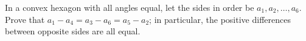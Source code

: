 In a convex hexagon with all angles equal, let the sides in order be $a_1,a_2,\dots,a_6$. Prove that $a_1-a_4=a_3-a_6=a_5-a_2$; in particular, the positive differences between opposite sides are all equal.
